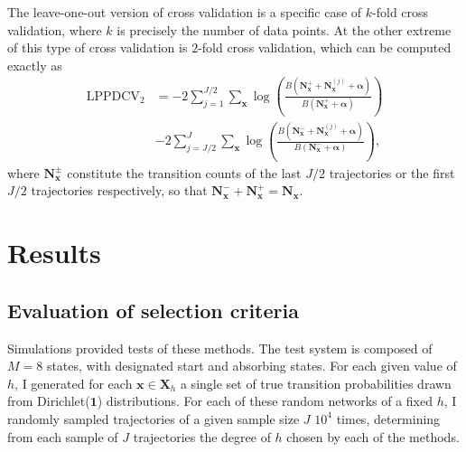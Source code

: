 \documentclass{IOS-Book-Article}
\newcommand{\bN}{\mathbf{N}}
\newcommand{\bx}{\mathbf{x}}
\newcommand{\balpha}{{\boldsymbol\alpha}}
\begin{document}
The leave-one-out version of cross validation is a specific case of $k$-fold cross validation, where $k$ is precisely the number of data points. At the other extreme of this type of cross validation is $2$-fold cross validation, which can be computed exactly as
\begin{align}
\textrm{LPPD}\textrm{CV}_2 &= -2\sum_{j=1}^{J/2} \sum_{\bx}  \log\left(  \frac{B(\bN^+_\bx +\bN_{\bx}^{(j)} +\balpha)}{B(\bN^+_\bx+\balpha)} \right)  \nonumber\\
& -2 \sum_{j=J/2}^{J} \sum_{\bx} \log\left(  \frac{B( \bN^-_\bx +\bN_{\bx}^{(j)} +\balpha)}{B( \bN^-_\bx +\balpha)} \right),
\end{align}
where $\bN^\pm_\bx$ constitute the transition counts of the last $J/2$ trajectories or the first $J/2$ trajectories respectively, so that $\bN^-_\bx + \bN^+_\bx = \bN_\bx$.

\section{Results}

\subsection{Evaluation of selection criteria}

Simulations provided tests of these methods.
The test system is composed of $M=8$ states, with designated start and absorbing states.  For each given value of $h$, I generated for each $\bx\in \mathbf{X}_h$ a single set of true transition probabilities drawn from Dirichlet($\mathbf{1}$) distributions. For each of these random networks of a fixed $h$, I randomly sampled trajectories of a given sample size $J$ $10^4$ times, determining from each sample of $J$ trajectories the degree of $h$ chosen by each of the methods.
\end{document}
